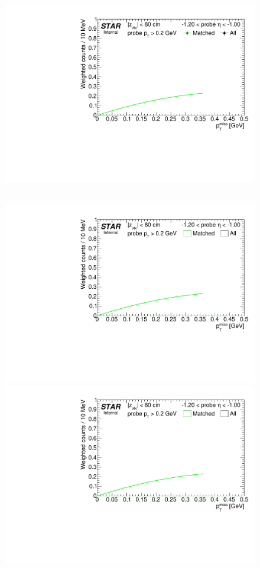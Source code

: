 \begin{figure}[ht]
{  \includegraphics[width=\linewidth,page=9]{graphics/systematicsEfficiency/TOF_tagAndProbe/Fitting_effVsEta_data.CPT.pdf}
}~
\parbox{0.495\textwidth}{
  \centering
  \includegraphics[width=\linewidth,page=6]{graphics/systematicsEfficiency/TOF_tagAndProbe/Fitting_effVsEta_mc.CPT.pdf}\\
  \includegraphics[width=\linewidth,page=7]{graphics/systematicsEfficiency/TOF_tagAndProbe/Fitting_effVsEta_mc.CPT.pdf}\\
}
\end{figure}
